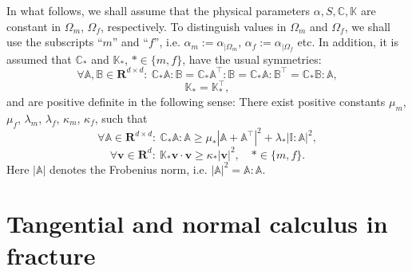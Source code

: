 \documentclass[a4paper]{article}
\def\CC{\tn C}
\def\nnu{\vc\nu}
\def\Real{{\mathbf R}}
\def\tn#1{{\mathbb{#1}}}    %
\def\vc#1{\mathbf{\boldsymbol{#1}}}     %
\def\vv{\vc v}
\newcommand{\eq}[1]{\begin{equation}#1\end{equation}}
\begin{document}
In what follows, we shall assume that the physical parameters $\alpha,S,\CC,\tn K$ are constant in $\Omega_m$, $\Omega_f$, respectively.
To distinguish values in $\Omega_m$ and $\Omega_f$, we shall use the subscripts ``$m$'' and ``$f$'', i.e. $\alpha_m := \alpha_{|\Omega_m}$, $\alpha_f := \alpha_{|\Omega_f}$ etc.
In addition, it is assumed that $\CC_*$ and $\tn K_*$, $*\in\{m,f\}$, have the usual symmetries:
\eq{ \label{eq:sym_C} \forall \tn A,\tn B\in\Real^{d\times d}:~ \CC_*\tn A:\tn B=\CC_*\tn A^\top:\tn B=\CC_*\tn A:\tn B^\top=\CC_*\tn B:\tn A, }
\eq{ \tn K_* = \tn K_*^\top, }
and are positive definite in the following sense:
There exist positive constants $\mu_m$, $\mu_f$, $\lambda_m$, $\lambda_f$, $\kappa_m$, $\kappa_f$, such that
\eq{ \label{eq:pos_def_C_gen} \forall\tn A\in\Real^{d\times d}:~\CC_*\tn A:\tn A \ge \mu_*\left|\tn A+\tn A^\top\right|^2 + \lambda_*|\tn I:\tn A|^2, }
\eq{ \label{eq:pos_def_K} \forall\vv\in\Real^d:~\tn K_*\vv\cdot\vv \ge \kappa_*|\vv|^2,\quad *\in\{m,f\}. }
Here %
$|\tn A|$ denotes the Frobenius norm, i.e. $|\tn A|^2=\tn A:\tn A$.




\section{Tangential and normal calculus in fracture}\label{sec:calculus}
\end{document}
